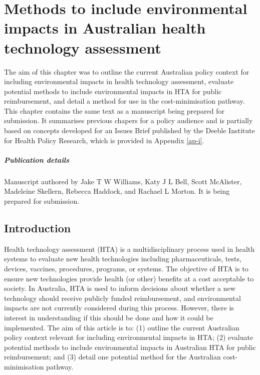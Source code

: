 \chapter{Methods to include environmental impacts in Australian health technology assessment}
\label{ch-9}

\begin{refsection}

The aim of this chapter was to outline the current Australian policy context for including environmental impacts in health technology assessment, evaluate potential methods to include environmental impacts in HTA for public reimbursement, and detail a method for use in the cost-minimisation pathway. This chapter contains the same text as a manuscript being prepared for submission. It summarises previous chapers for a policy audience and is partially based on concepts developed for an Issues Brief published by the Deeble Institute for Health Policy Research, which is provided in Appendix \ref{ap-i}.

\paragraph*{Publication details}
Manuscript authored by Jake T W Williams, Katy J L Bell, Scott McAlister, Madeleine Skellern, Rebecca Haddock, and Rachael L Morton. It is being prepared for submission.

\clearpage

\section{Introduction}
Health technology assessment (HTA) is a multidisciplinary process used in health systems to evaluate new health technologies including pharmaceuticals, tests, devices, vaccines, procedures, programs, or systems. The objective of HTA is to ensure new technologies provide health (or other) benefits at a cost acceptable to society.\cite{orourke_new_2020} In Australia, HTA is used to inform decisions about whether a new technology should receive publicly funded reimbursement, and environmental impacts are not currently considered during this process. However, there is interest in understanding if this should be done and how it could be implemented. The aim of this article is to: (1) outline the current Australian policy context relevant for including environmental impacts in HTA; (2) evaluate potential methods to include environmental impacts in Australian HTA for public reimbursement; and (3) detail one potential method for the Australian cost-minimisation pathway. 


\end{refsection}
